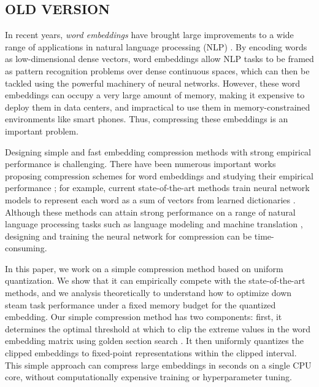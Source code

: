 

\subsection{OLD VERSION}
In recent years, \textit{word embeddings} \citep{word2vec13,glove14,fasttext18} have brought large improvements to a wide range of applications in natural language processing (NLP) \citep{collins16,drqa17}.
By encoding words as low-dimensional dense vectors, word embeddings allow NLP tasks to be framed as pattern recognition problems over dense continuous spaces, which can then be tackled using the powerful machinery of neural networks.
However, these word embeddings can occupy a very large amount of memory, making it expensive to deploy them in data centers, and impractical to use them in memory-constrained environments like smart phones.
Thus, compressing these embeddings is an important problem.

Designing simple and fast embedding compression methods with strong empirical performance is challenging.
There have been numerous important works proposing compression schemes for word embeddings and studying their empirical performance \citep{sparse16,andrews16,dccl17,kway18};
for example, current state-of-the-art methods train neural network models to represent each word as a sum of vectors from learned dictionaries \citep{dccl17,kway18}.
Although these methods can attain strong performance on a range of natural language processing tasks such as language modeling \citep{mikolov10} and machine translation \citep{bahdanau15}, designing and training the neural network for compression can be time-consuming.

In this paper, we work on a simple compression method based on uniform quantization. We show that it can empirically compete with the state-of-the-art methods, and we analysis theoretically to understand how to optimize down steam task performance under a fixed memory budget for the quantized embedding.
Our simple compression method has two components: first, it determines the optimal threshold at which to clip the extreme values in the word embedding matrix using golden section search \citep{golden53}.
It then uniformly quantizes the clipped embeddings to fixed-point representations within the clipped interval.
This simple approach can compress large embeddings in seconds on a single CPU core, without computationally expensive training or hyperparameter tuning.


